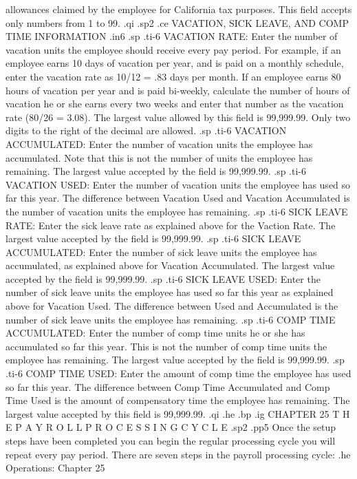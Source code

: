 allowances claimed by the employee for California tax purposes.  This
field accepts only numbers from 1 to 99.
.qi
.sp2
.ce
VACATION, SICK LEAVE, AND COMP TIME INFORMATION
.in6
.sp
.ti-6
VACATION RATE: Enter the number of vacation units the employee should
receive every pay period.  For example, if an employee earns 10 days
of vacation per year, and is paid on a monthly schedule, enter the
vacation rate as 10/12 = .83 days per month.  If an employee earns
80 hours of vacation per year and is paid bi-weekly, calculate the
number of hours of vacation he or she earns every two weeks and enter
that number as the vacation rate (80/26 = 3.08).
The largest value allowed by this field is 99,999.99.  Only two digits
to the right of the decimal are allowed.
.sp
.ti-6
VACATION ACCUMULATED:  Enter the number of vacation units the employee
has accumulated. Note that this is not the number of units the
employee has remaining.
The largest value accepted by the field is 99,999.99.
.sp
.ti-6
VACATION USED:	Enter the number of vacation units the employee has
used so far this year.	The difference between Vacation Used and
Vacation Accumulated is the number of vacation units the
employee has remaining.
.sp
.ti-6
SICK LEAVE RATE: Enter the sick leave rate as explained above for
the Vaction Rate.  The largest value accepted by the field is
99,999.99.
.sp
.ti-6
SICK LEAVE ACCUMULATED: Enter the number of sick leave units the employee
has accumulated,
as explained above for Vacation Accumulated.  The largest value accepted
by the field is 99,999.99.
.sp
.ti-6
SICK LEAVE USED: Enter the number of sick leave units the employee
has used so far this year as explained above for Vacation Used.
The difference between Used and Accumulated is the number of sick leave
units the employee has remaining.
.sp
.ti-6
COMP TIME ACCUMULATED: Enter the
number of comp time units he or she has accumulated so far this year.
This is not the number of comp time units the employee has remaining.
The largest value accepted by the field
is 99,999.99.
.sp
.ti-6
COMP TIME USED:  Enter the amount of comp time the employee
has used so far this year.
The difference between Comp Time Accumulated and Comp Time Used
is the amount of compensatory time the employee has remaining.
The largest value accepted by this field is 99,999.99.
.qi
.he
.bp
.ig
CHAPTER 25
T H E	P A Y R O L L	P R O C E S S I N G    C Y C L E
.sp2
.pp5
Once the setup steps have been completed you can begin the regular
processing cycle you will repeat every pay period.  There are seven
steps in the payroll processing cycle:
.he Operations: Chapter 25
